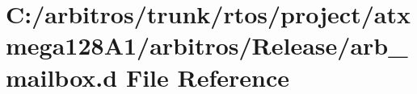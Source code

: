 \hypertarget{rtos_2project_2atxmega128_a1_2arbitros_2_release_2arb__mailbox_8d}{\section{C\-:/arbitros/trunk/rtos/project/atxmega128\-A1/arbitros/\-Release/arb\-\_\-mailbox.d File Reference}
\label{rtos_2project_2atxmega128_a1_2arbitros_2_release_2arb__mailbox_8d}
}

